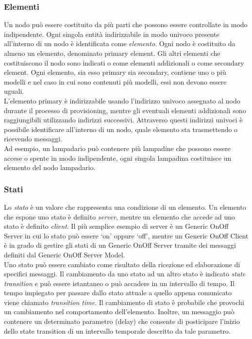 \subsubsection{Elementi}
\label{subsub:elementi}
Un nodo può essere costituito da più parti che possono essere controllate in modo indipendente. Ogni singola entità indirizzabile in modo univoco presente all'interno di un nodo è identificata come \textit{elemento}. Ogni nodo è costituito da almeno un elemento, denominato primary element. Gli altri elementi che costituiscono il nodo sono indicati o come elementi addizionali o come secondary element. Ogni elemento, sia esso primary sia secondary, contiene uno o più modelli e nel caso in cui sono contenuti più modelli, essi non devono essere uguali.\\
L'elemento primary è indirizzabile usando l'indirizzo univoco assegnato al nodo durante il processo di provisioning, mentre gli eventuali elementi addizionali sono raggiungibili utilizzando indirizzi successivi. Attraverso questi indirizzi univoci è possibile identificare all'interno di un nodo, quale elemento sta trasmettendo o ricevendo messaggi.\\
Ad esempio, un lampadario può contenere più lampadine che possono essere accese o spente in modo indipendente, ogni singola lampadina costituisce un elemento del nodo lampadario.

\subsubsection{Stati}
\label{subsub:stati}
Lo \textit{stato} è un valore che rappresenta una condizione di un elemento. Un elemento che espone uno stato è definito \textit{server}, mentre un elemento che accede ad uno stato è definito \textit{client}. Il più semplice esempio di server è un Generic OnOff Server in cui lo stato può essere `on' oppure `off', mentre un Generic OnOff Client è in grado di gestire gli stati di un Generic OnOff Server tramite dei messaggi definiti dal Generic OnOff Server Model.\\
Uno stato può essere cambiato come risultato della ricezione ed elaborazione di specifici messaggi. Il cambiamento da uno stato ad un altro stato è indicato \textit{state transition} e può essere istantaneo o può accadere in un intervallo di tempo. Il tempo impiegato per passare dallo stato attuale a quello appena comunicato viene chiamato \textit{transition time}. Il cambiamento di stato è probabile che provochi un cambiamento nel comportamento dell'elemento. Inoltre, un messaggio può contenere un determinato parametro (delay) che consente di posticipare l'inizio dello state transition di un intervallo temporale descritto da tale parametro.\\

